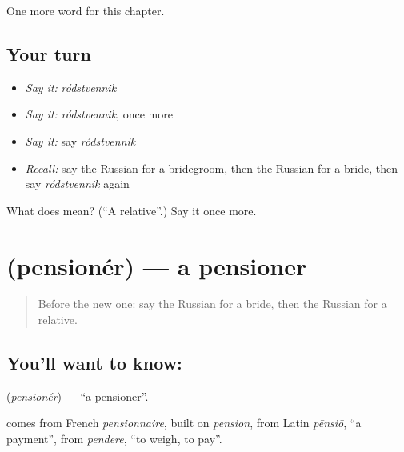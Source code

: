 \begin{grammarlens}[title={What you've built}]
One more word for this chapter.
\end{grammarlens}

\subsection*{Your turn}
\begin{itemize}
\raggedright
  \item \emph{Say it:} \emph{ródstvennik}
  \item \emph{Say it:} \emph{ródstvennik}, once more
  \item \emph{Say it:} say \emph{ródstvennik}
  \item \emph{Recall:} say the Russian for a bridegroom, then the Russian for a bride, then say \emph{ródstvennik} again
\end{itemize}

\begin{tcolorbox}[breakable,colback=teal!4,colframe=teal!35!black,title={Before you move on}]
What does  mean? (\textquotedblleft{}A relative\textquotedblright{}.) Say it once more.
\end{tcolorbox}
\section[\texorpdfstring{\ru{пенсионер} (pensionér)}{пенсионер (pensionér)}]{ (pensionér) — a pensioner}

\label{lesson:RU-C168-pensioner}



\begin{quote}
Before the new one: say the Russian for a bride, then the Russian for a relative.
\end{quote}

\subsection*{You'll want to know: }
\textbf{} (\emph{pensionér}) — \textquotedblleft{}a pensioner\textquotedblright{}.

\begin{cousinweb}
\textbf{} comes from French \emph{pensionnaire}, built on \emph{pension}, from Latin \emph{pēnsiō}, \textquotedblleft{}a payment\textquotedblright{}, from \emph{pendere}, \textquotedblleft{}to weigh, to pay\textquotedblright{}.
\end{cousinweb}


